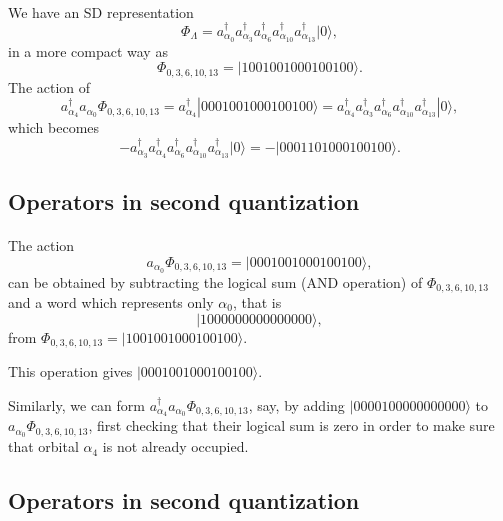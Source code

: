 \documentclass[%
twoside,                 %
final,                   %
10pt]{article}
\begin{document}
\paragraph{}
We have an SD representation
\[
\Phi_{\Lambda} = a_{\alpha_0}^{\dagger} a_{\alpha_3}^{\dagger} a_{\alpha_6}^{\dagger} a_{\alpha_{10}}^{\dagger} a_{\alpha_{13}}^{\dagger} |0\rangle,
\]
in a more compact way as
\[
\Phi_{0,3,6,10,13} = |1001001000100100\rangle.
\]
The action of
\[
a^{\dagger}_{\alpha_4}a_{\alpha_0}\Phi_{0,3,6,10,13} = a^{\dagger}_{\alpha_4}|0001001000100100\rangle=a^{\dagger}_{\alpha_4}a_{\alpha_3}^{\dagger} a_{\alpha_6}^{\dagger} a_{\alpha_{10}}^{\dagger} a_{\alpha_{13}}^{\dagger} |0\rangle,
\]
which becomes
\[
-a_{\alpha_3}^{\dagger} a^{\dagger}_{\alpha_4} a_{\alpha_6}^{\dagger} a_{\alpha_{10}}^{\dagger} a_{\alpha_{13}}^{\dagger} |0\rangle=-|0001101000100100\rangle.
\]






\subsection*{Operators in second quantization}

\paragraph{}
The action
\[
a_{\alpha_0}\Phi_{0,3,6,10,13} = |0001001000100100\rangle,
\]
can be obtained by subtracting the logical sum (AND operation) of $\Phi_{0,3,6,10,13}$ and 
a word which represents only $\alpha_0$, that is
\[
|1000000000000000\rangle,
\] 
from $\Phi_{0,3,6,10,13}= |1001001000100100\rangle$.

This operation gives $|0001001000100100\rangle$. 

Similarly, we can form $a^{\dagger}_{\alpha_4}a_{\alpha_0}\Phi_{0,3,6,10,13}$, say, by adding 
$|0000100000000000\rangle$ to $a_{\alpha_0}\Phi_{0,3,6,10,13}$, first checking that their logical sum
is zero in order to make sure that orbital $\alpha_4$ is not already occupied.






\subsection*{Operators in second quantization}
\end{document}

